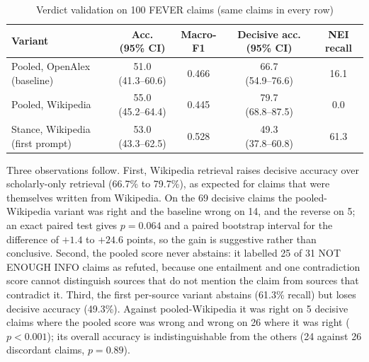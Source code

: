 \documentclass[conference]{IEEEtran}
\begin{document}
\begin{table}[t]
\caption{Verdict validation on 100 FEVER claims (same claims in every row)}
\centering
\footnotesize
\begin{tabular}{lcccc}
\toprule
Variant & Acc. (95\% CI) & Macro-F1 & Decisive acc. (95\% CI) & NEI recall \\
\midrule
Pooled, OpenAlex (baseline) & \shortstack{51.0\\(41.3--60.6)} & 0.466 & \shortstack{66.7\\(54.9--76.6)} & 16.1 \\
Pooled, Wikipedia & \shortstack{55.0\\(45.2--64.4)} & 0.445 & \shortstack{79.7\\(68.8--87.5)} & 0.0 \\
Stance, Wikipedia (first prompt) & \shortstack{53.0\\(43.3--62.5)} & 0.528 & \shortstack{49.3\\(37.8--60.8)} & 61.3 \\
\bottomrule
\end{tabular}
\par\vspace{2pt}{\scriptsize Percent, except macro-F1. NEI: NOT ENOUGH INFO. Coverage (claims with at least one relevant source) was 97.0, 100.0 and 95.0 percent in the three rows.}
\end{table}

Three observations follow. First, Wikipedia retrieval raises decisive accuracy over scholarly-only retrieval (66.7\% to 79.7\%), as expected for claims that were themselves written from Wikipedia. On the 69 decisive claims the pooled-Wikipedia variant was right and the baseline wrong on 14, and the reverse on 5; an exact paired test gives $p = 0.064$ and a paired bootstrap interval for the difference of $+1.4$ to $+24.6$ points, so the gain is suggestive rather than conclusive. Second, the pooled score never abstains: it labelled 25 of 31 NOT ENOUGH INFO claims as refuted, because one entailment and one contradiction score cannot distinguish sources that do not mention the claim from sources that contradict it. Third, the first per-source variant abstains (61.3\% recall) but loses decisive accuracy (49.3\%). Against pooled-Wikipedia it was right on 5 decisive claims where the pooled score was wrong and wrong on 26 where it was right ($p < 0.001$); its overall accuracy is indistinguishable from the others (24 against 26 discordant claims, $p = 0.89$).
\end{document}
